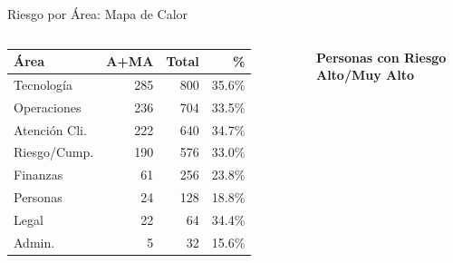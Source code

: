 \documentclass[aspectratio=169,12pt]{beamer}
\begin{document}
\begin{frame}[shrink=5]{Riesgo por Área: Mapa de Calor}
  \begin{columns}[T]
      \footnotesize
      \begin{tabular}{@{}lrrr@{}}
        \toprule
        \rowcolor{NavyDeep}
          \color{White}\textbf{Área} &
          \color{White}\textbf{A+MA} &
          \color{White}\textbf{Total} &
          \color{White}\textbf{\%} \\
        \midrule
        \rowcolor{RedRisk!20} Tecnología    & 285 & 800 & 35.6\% \\
        \rowcolor{RedRisk!12} Operaciones   & 236 & 704 & 33.5\% \\
        \rowcolor{Amber!15}   Atención Cli. & 222 & 640 & 34.7\% \\
        \rowcolor{Amber!10}   Riesgo/Cump.  & 190 & 576 & 33.0\% \\
        \rowcolor{Gold!8}     Finanzas      &  61 & 256 & 23.8\% \\
        \rowcolor{GreenOK!8}  Personas      &  24 & 128 & 18.8\% \\
        \rowcolor{GreenOK!5}  Legal         &  22 &  64 & 34.4\% \\
        \rowcolor{GreenOK!5}  Admin.        &   5 &  32 & 15.6\% \\
        \bottomrule
      \end{tabular}

      \vspace{4pt}
      \begin{tcolorbox}[
        enhanced, colback=NavyDeep!5, colframe=NavyLight,
        arc=5pt, boxrule=1pt, left=3pt, right=3pt, top=4pt, bottom=4pt
      ]
        \centering
        {\color{NavyDeep}\footnotesize\bfseries Personas con Riesgo Alto/Muy Alto}
        \vspace{3pt}


\end{tcolorbox}
\end{columns}
\end{frame}
\end{document}
